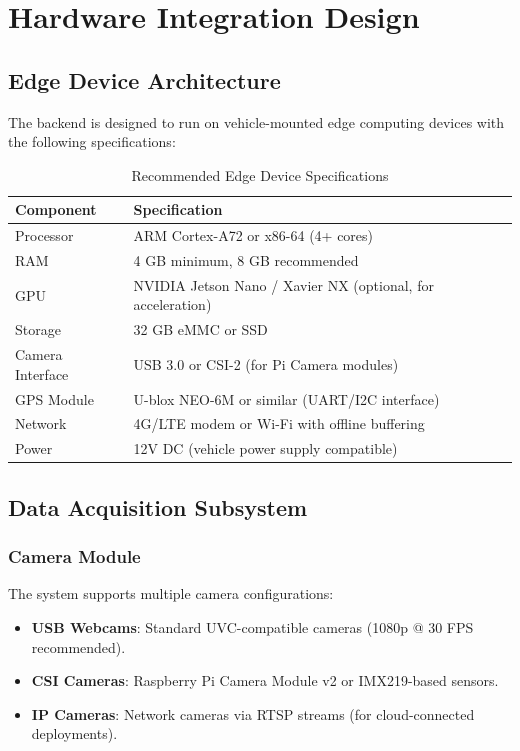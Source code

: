 \documentclass[12pt]{article}
\begin{document}
\clearpage

\section{Hardware Integration Design}

\subsection{Edge Device Architecture}

The backend is designed to run on vehicle-mounted edge computing devices with the following specifications:

\begin{table}[H]
    \centering
    \caption{Recommended Edge Device Specifications}
    \label{tab:edge-specs}
    \begin{tabular}{ll}
        \toprule
        \textbf{Component} & \textbf{Specification} \\
        \midrule
        Processor & ARM Cortex-A72 or x86-64 (4+ cores) \\
        RAM & 4 GB minimum, 8 GB recommended \\
        GPU & NVIDIA Jetson Nano / Xavier NX (optional, for acceleration) \\
        Storage & 32 GB eMMC or SSD \\
        Camera Interface & USB 3.0 or CSI-2 (for Pi Camera modules) \\
        GPS Module & U-blox NEO-6M or similar (UART/I2C interface) \\
        Network & 4G/LTE modem or Wi-Fi with offline buffering \\
        Power & 12V DC (vehicle power supply compatible) \\
        \bottomrule
    \end{tabular}
\end{table}

\subsection{Data Acquisition Subsystem}

\subsubsection*{Camera Module}

The system supports multiple camera configurations:

\begin{itemize}
    \item \textbf{USB Webcams}: Standard UVC-compatible cameras (1080p @ 30 FPS recommended).
    \item \textbf{CSI Cameras}: Raspberry Pi Camera Module v2 or IMX219-based sensors.
    \item \textbf{IP Cameras}: Network cameras via RTSP streams (for cloud-connected deployments).
\end{itemize}
\end{document}

